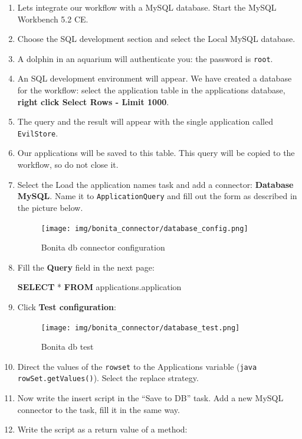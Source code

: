 \documentclass[]{report}
\newenvironment{Shaded}{}{}
\newcommand{\KeywordTok}[1]{\textcolor[rgb]{0.00,0.44,0.13}{\textbf{{#1}}}}
\newcommand{\NormalTok}[1]{{#1}}
\begin{document}
\begin{enumerate}
\def\labelenumi{\arabic{enumi}.}
\item
  Lets integrate our workflow with a MySQL database. Start the MySQL
  Workbench 5.2 CE.
\item
  Choose the SQL development section and select the Local MySQL
  database.
\item
  A dolphin in an aquarium will authenticate you: the password is
  \texttt{root}.
\item
  An SQL development environment will appear. We have created a database
  for the workflow: select the application table in the applications
  database, \textbf{right click \textbar{} Select Rows - Limit 1000}.
\item
  The query and the result will appear with the single application
  called \texttt{EvilStore}.
\item
  Our applications will be saved to this table. This query will be
  copied to the workflow, so do not close it.
\item
  Select the Load the application names task and add a connector:
  \textbf{Database \textbar{} MySQL}. Name it to
  \texttt{ApplicationQuery} and fill out the form as described in the
  picture below.

  \begin{figure}[htbp]
  \centering
  \texttt{[image: img/bonita\_connector/database\_config.png]}
  \caption{Bonita db connector configuration}
  \end{figure}
\item
  Fill the \textbf{Query} field in the next page:

\begin{Shaded}
\begin{Highlighting}[]
\KeywordTok{SELECT} \NormalTok{* }\KeywordTok{FROM} \NormalTok{applications.application}
\end{Highlighting}
\end{Shaded}
\item
  Click \textbf{Test configuration}:

  \begin{figure}[htbp]
  \centering
  \texttt{[image: img/bonita\_connector/database\_test.png]}
  \caption{Bonita db test}
  \end{figure}
\item
  Direct the values of the \texttt{rowset} to the Applications variable
  (\texttt{java rowSet.getValues()}). Select the replace strategy.
\item
  Now write the insert script in the ``Save to DB'' task. Add a new
  MySQL connector to the task, fill it in the same way.
\item
  Write the script as a return value of a method:


\end{enumerate}
\end{document}
